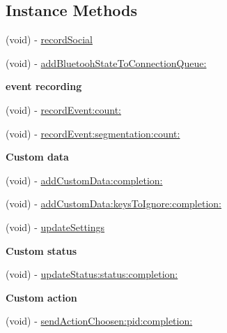 \subsection*{Instance Methods}
\begin{DoxyCompactItemize}
\item 
(void) -\/ \hyperlink{interface_t_q_analytics_a91c06faeb927363c040b516ed195449c}{record\+Social}
\item 
(void) -\/ \hyperlink{interface_t_q_analytics_a27858a475fc0338c9975e32b0bb21f12}{add\+Bluetooh\+State\+To\+Connection\+Queue\+:}
\end{DoxyCompactItemize}
\begin{Indent}{\bf event recording}\par
\begin{DoxyCompactItemize}
\item 
(void) -\/ \hyperlink{interface_t_q_analytics_ae399bfa3974b8464f6bf475657e62363}{record\+Event\+:count\+:}
\item 
(void) -\/ \hyperlink{interface_t_q_analytics_a904f5ef03adb907dd15c0a1c6805caaf}{record\+Event\+:segmentation\+:count\+:}
\end{DoxyCompactItemize}
\end{Indent}
\begin{Indent}{\bf Custom data}\par
\begin{DoxyCompactItemize}
\item 
(void) -\/ \hyperlink{interface_t_q_analytics_aa5ca45a7be910512ad72cbfe70a005e3}{add\+Custom\+Data\+:completion\+:}
\item 
(void) -\/ \hyperlink{interface_t_q_analytics_a5a882188abdb0b24adcbaa1e2c6ecec0}{add\+Custom\+Data\+:keys\+To\+Ignore\+:completion\+:}
\item 
(void) -\/ \hyperlink{interface_t_q_analytics_a98186f450231638021ad14fc771163f6}{update\+Settings}
\end{DoxyCompactItemize}
\end{Indent}
\begin{Indent}{\bf Custom status}\par
\begin{DoxyCompactItemize}
\item 
(void) -\/ \hyperlink{interface_t_q_analytics_a04fa7504b4a51fd75b8fc52494009179}{update\+Status\+:status\+:completion\+:}
\end{DoxyCompactItemize}
\end{Indent}
\begin{Indent}{\bf Custom action}\par
\begin{DoxyCompactItemize}
\item 
(void) -\/ \hyperlink{interface_t_q_analytics_ab6b929f63a2224dc0b33d5d7ad2c9b58}{send\+Action\+Choosen\+:pid\+:completion\+:}
\end{DoxyCompactItemize}
\end{Indent}
